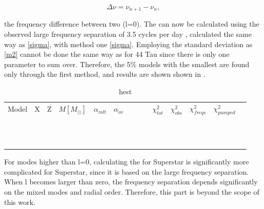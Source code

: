 \begin{equation}
    \Delta\nu = \nu_{n+1} - \nu_{n},
\end{equation}

\noindent the frequency difference between two (l=0).  The \chis can now be calculated using the observed large frequency separation of 3.5 cycles per day \citep{antoci2014role}, calculated the same way as  \eqref{sigma}, with method one \eqref{sigma}. Employing the standard deviation as \eqref{m2} cannot be done the same way as for 44 Tau since there is only one parameter to sum over. Therefore, the 5\% models with the smallest \chis are found only through the first method, and results are shown shown in .

\begin{table}
  \caption{hest}
  \label{tab:superstar}

	\begin{tabular}{llllllllllllll}
	 Model & X & Z & $M[M_\odot]$ & $\alpha_{mlt}$ & $\alpha_{ov}$ & \teff  & \logg  & \lum & $\chi_{tot}^2$ &$\chi_{obs}^2$ & $\chi_{freqs}^2$ & $\chi_{pumped}^2$\\
	 &  &  &  &  &  &  &  &  &  &  \\
 	&  &  &  &  &  &  &  &  &  &  \\
 	&  &  &  &  &  &  &  &  &  &  \\
	 &  &  &  &  &  &  &  &  &  &  \\
 	&  &  &  &  &  &  &  &  &  &  \\
	 &  &  &  &  &  &  &  &  &  &  \\
	 &  &  &  &  &  &  &  &  &  &  \\
	 &  &  &  &  &  &  &  &  &  &  \\
	 &  &  &  &  &  &  &  &  &  &  \\
	 &  &  &  &  &  &  &  &  &  &  \\
 	&  &  &  &  &  &  &  &  &  &  \\
 	&  &  &  &  &  &  &  &  &  &  \\
	\end{tabular}
\end{table}

For modes higher than l=0, calculating the \chis for Superstar is significantly more complicated for Superstar, since it is based on the large frequency separation. When l becomes larger than zero, the frequency separation depends significantly on the mixed modes and radial order. Therefore, this part is beyond the scope of this work. 

